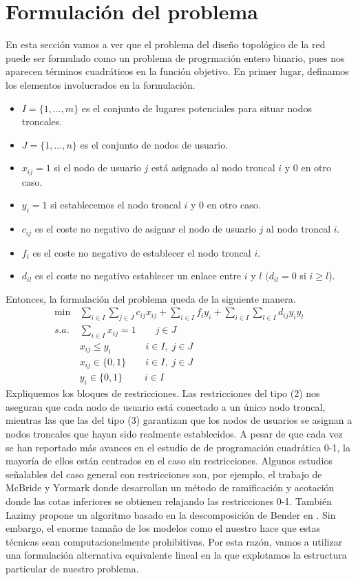 \documentclass[twoside,12pt]{article}
\begin{document}
\section{Formulación del problema}
En esta sección vamos a ver que el problema del diseño topológico de la red puede ser formulado como un problema de progrmación entero binario, pues nos aparecen términos cuadráticos en la función objetivo. En primer lugar, definamos los elementos involucrados en la formulación.
\begin{itemize}
\item $I=\{1,\dotsc,m\}$ es el conjunto de lugares potenciales para situar nodos troncales.
\item $J=\{1,\dotsc,n\}$ es el conjunto de nodos de usuario.
\item $x_{ij}=1$ si el nodo de usuario $j$ está asignado al nodo troncal $i$ y $0$ en otro caso.
\item $y_i =1$ si establecemos el nodo troncal $i$ y $0$ en otro caso.
\item $c_{ij}$ es el coste no negativo de asignar el nodo de usuario $j$ al nodo troncal $i$.
\item $f_i$ es el coste no negativo de establecer el nodo troncal $i$. 
\item $d_{il}$ es el coste no negativo establecer un enlace entre $i$ y $l$ $(d_{il} = 0$ si $i\geq l$).
\end{itemize}
Entonces, la formulación del problema queda de la siguiente manera.
\begin{align}
\min \,& \sum_{i\in I} \sum_{j\in J} c_{ij}x_{ij} + \sum_{i\in I} f_i y_i + \sum_{i \in I}\sum_{l \in I} d_{ij}y_iy_l\\
s.a.\,& \sum_{i\in I} x_{ij} = 1 \qquad  j \in J\\
& x_{ij}\leq y_i \quad\;\;\qquad i \in I,\; j\in J\\
&x_{ij}\in\{0,1\} \qquad i \in I,\; j\in J\\
&y_i\in\{0,1\} \qquad \;i\in I
\end{align}
Expliquemos los bloques de restricciones. Las restricciones del tipo (2) nos aseguran que cada nodo de usuario está conectado a un único nodo troncal, mientras las que las del tipo (3) garantizan que los nodos de usuarios se asignan a nodos troncales que hayan sido realmente establecidos. A pesar de que cada vez se han reportado más avances en el estudio de de programación cuadrática 0-1, la mayoría de ellos están centrados en el caso sin restricciones. Algunos estudios señalables del caso general con restricciones son, por ejemplo, el trabajo de McBride y Yormark \cite{mcbride} donde desarrollan un método  de ramificación y acotación donde las cotas inferiores se obtienen relajando las restricciones 0-1. También Lazimy propone un algoritmo basado en la descomposición de Bender en \cite{lazi}. Sin embargo, el enorme tamaño de los modelos como el nuestro hace que estas técnicas sean computacionelmente prohibitivas. Por esta razón, vamos a utilizar una formulación alternativa equivalente lineal en la que explotamos la estructura particular de nuestro problema.
\end{document}
